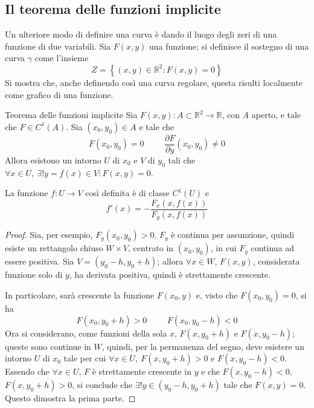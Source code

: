 \documentclass[10pt, a4paper]{scrartcl}
\theoremstyle{definition}
\numberwithin{esempio}{section}
\theoremstyle{definition}
\numberwithin{obs}{section}
\numberwithin{nota}{section}
\numberwithin{equation}{subsection}
\begin{document}
\subsection{Il teorema delle funzioni implicite}
Un ulteriore modo di definire una curva \`e dando il luogo degli zeri di una funzione di due variabili. 
Sia $F(x,y)$ una funzione; si  definisce il sostegno di una curva $\gamma$ come l'insieme
\[
Z = \left\{ (x,y) \in \mathbb{R}^2 : F(x,y) = 0 \right\} 
\] 
Si mostra che, anche definendo cos\`i una curva regolare, questa risulti localmente come grafico di una funzione.
\begin{teorema}
	{Teorema delle funzioni implicite}{}
	Sia $F(x,y):A \subset \mathbb{R}^2 \to \mathbb{R}$, con $A$ aperto, e tale che $F \in C^1(A)$.
	Sia $(x_0,y_0) \in A $ e tale che
	\[
		F(x_0,y_0) = 0 \hspace{1cm} \frac{\partial F}{\partial y} (x_0,y_0) \neq 0
	\] 
Allora esistono un intorno $U$ di $x_0$ e $V$ di $y_0$  tali che $\forall x \in U, \ \exists ! y = f(x) \in V : F(x,y)=0$.

La funzione $f:U \to V$ cos\`i definita \`e di classe $C^1(U)$ e 
\[
f'(x) = - \frac{F_x(x,f(x))}{F_y(x,f(x))}
\] 
\begin{proof}
	Sia, per esempio, $F_{y} (x_0,y_0)>0$. 
	$F_y$ \`e continua per assunzione, quindi esiste un rettangolo chiuso $W \times V$, centrato in $(x_0,y_0)$, in cui $F_y$ continua ad essere positiva.
	Sia $V=(y_0-h,y_0+h)$; allora  $\forall x \in W$, $F(x,y)$, considerata funzione solo di $y$, ha derivata positiva, quindi \`e strettamente crescente.

	In particolare, sar\`a crescente la funzione $F(x_0,y)$ e, visto che $F(x_0,y_0) = 0$, si ha
	\[
		F(x_0,y_0+h) > 0 \hspace{1cm} F(x_0,y_0 - h) < 0
	\] 
Ora si considerano, come funzioni della sola $x$, $F(x,y_0+h)$ e $F(x,y_0-h)$; queste sono continue in $W$, quindi, per la permanenza del segno, deve esistere un intorno $U$ di $x_0$ tale per cui $\forall x \in U, \ F(x,y_0+h) >0 $ e $F(x,y_0-h)<0$.
Essendo che $\forall x \in U$, $F$ \`e strettamente crescente in $y$ e che $F(x,y_0-h) < 0$, $F(x,y_0+h)>0$, si conclude che $\exists ! y \in (y_0-h,y_0+h)$ tale che $F(x,y) = 0$.
Questo dimostra la prima parte.


\end{proof}
\end{teorema}
\end{document}
